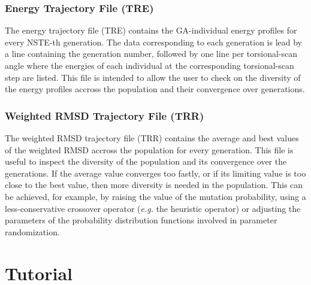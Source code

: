 \documentclass[10pt,a4paper,openany]{memoir}
\numberwithin{equation}{section}
\begin{document}
\subsection{Energy Trajectory File (TRE)}
\label{sec:file-formats-TRE}

The energy trajectory file (TRE) contains the GA-individual energy
profiles for every NSTE-th generation.  The data corresponding to each
generation is lead by a line containing the generation number,
followed by one line per torsional-scan angle where the energies of
each individual at the corresponding torsional-scan step are listed.
This file is intended to allow the user to check on the diversity of
the energy profiles accross the population and their convergence over
generations.

\subsection{Weighted RMSD Trajectory File (TRR)}
\label{sec:file-formats-TRR}

The weighted RMSD trajectory file (TRR) contains the average and best
values of the weighted RMSD accross the population for every
generation.  This file is useful to inspect the diversity of the
population and its convergence over the generations. If the average
value converges too fastly, or if its limiting value is too close to
the best value, then more diversity is needed in the population.  This
can be achieved, for example, by raising the value of the mutation
probability, using a less-conservative crossover operator
(\textit{e.g.} the heuristic operator) or adjusting the parameters of
the probability distribution functions involved in parameter
randomization.

\chapter{Tutorial}
\label{chap:tutorial}
 
\end{document}
